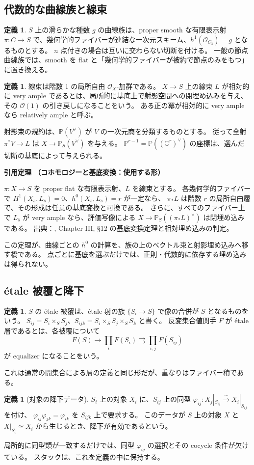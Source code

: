 \documentclass[dvipdfmx,a4paper,11pt]{article}
\theoremstyle{definition}
\newtheorem{dfn}[thm]{定義}
\newcommand{\C}{\mathbb C}\newcommand{\R}{\mathbb R}\newcommand{\Z}{\mathbb Z}\newcommand{\Q}{\mathbb Q}
\newcommand{\PP}{\mathbb P}\newcommand{\HH}{\mathbb H}
\newcommand{\OO}{\mathcal O}\newcommand{\MM}{\mathcal M}\newcommand{\TT}{\mathcal T}
\newenvironment{external}[1]{\Needspace{7\baselineskip}\refstepcounter{thm}\begin{tcolorbox}[mybox,colback=blue!2,colframe=blue!40!black]\textbf{引用定理 \thethm（#1）}\par}{\end{tcolorbox}}
\begin{document}
\subsection{代数的な曲線族と線束}
\begin{dfn}\label{def:algfamily}
$S$ 上の滑らかな種数 $g$ の曲線族は、proper smooth な有限表示射 $\pi:C\to S$ で、幾何学的ファイバーが連結な一次元スキーム、$h^1(\OO_{C_{\bar s}})=g$ となるものとする。
$n$ 点付きの場合は互いに交わらない切断を付ける。
一般の節点曲線族では、smooth を flat と「幾何学的ファイバーが被約で節点のみをもつ」に置き換える。
\end{dfn}
\begin{dfn}
線束は階数 $1$ の局所自由 $\OO_X$-加群である。
$X\to S$ 上の線束 $L$ が相対的に very ample であるとは、局所的に基底上で射影空間への閉埋め込みを与え、その $\OO(1)$ の引き戻しになることをいう。
ある正の冪が相対的に very ample なら relatively ample と呼ぶ。
\end{dfn}
射影束の規約は、$\PP(V^\vee)$ が $V$ の一次元商を分類するものとする。
従って全射 $\pi^*V\to L$ は $X\to\PP_S(V^\vee)$ を与える。
$\PP^{r-1}=\PP((\C^r)^\vee)$ の座標は、選んだ切断の基底によって与えられる。

\begin{external}{コホモロジーと基底変換：使用する形}\label{input:basechange}
$\pi:X\to S$ を proper flat な有限表示射、$L$ を線束とする。
各幾何学的ファイバーで $H^1(X_{\bar s},L_{\bar s})=0$、$h^0(X_{\bar s},L_{\bar s})=r$ が一定なら、
$\pi_*L$ は階数 $r$ の局所自由層で、その形成は任意の基底変換と可換である。
さらに、すべてのファイバー上で $L_{\bar s}$ が very ample なら、評価写像による
$X\to\PP_S((\pi_*L)^\vee)$ は閉埋め込みである。
出典：\cite{Hartshorne}, Chapter III, \S12 の基底変換定理と相対埋め込みの判定。
\end{external}
この定理が、曲線ごとの $h^0$ の計算を、族の上のベクトル束と射影埋め込みへ移す橋である。
点ごとに基底を選ぶだけでは、正則・代数的に依存する埋め込みは得られない。

\subsection{étale 被覆と降下}
\begin{dfn}
$S$ の étale 被覆は、étale 射の族 $\{S_i\to S\}$ で像の合併が $S$ となるものをいう。
$S_{ij}=S_i\times_SS_j$、$S_{ijk}=S_i\times_SS_j\times_SS_k$ と書く。
反変集合値関手 $F$ が étale 層であるとは、各被覆について
\[
F(S)\longrightarrow\prod_iF(S_i)\rightrightarrows\prod_{i,j}F(S_{ij})
\]
が equalizer になることをいう。
\end{dfn}
これは通常の開集合による層の定義と同じ形だが、重なりはファイバー積である。
\begin{dfn}[対象の降下データ]
$S_i$ 上の対象 $X_i$ に、$S_{ij}$ 上の同型
$\varphi_{ij}:X_j|_{S_{ij}}\xrightarrow{\sim}X_i|_{S_{ij}}$ を付け、
$\varphi_{ij}\varphi_{jk}=\varphi_{ik}$ を $S_{ijk}$ 上で要求する。
このデータが $S$ 上の対象 $X$ と $X|_{S_i}\simeq X_i$ から生じるとき、降下が有効であるという。
\end{dfn}
局所的に同型類が一致するだけでは、同型 $\varphi_{ij}$ の選択とその cocycle 条件が欠けている。
スタックは、これを定義の中に保持する。
\end{document}
